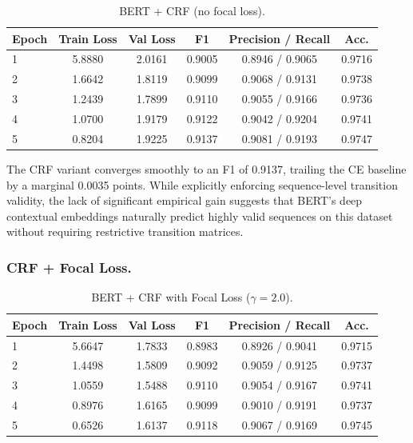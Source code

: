 \begin{table}[htbp]
    \centering
    \begin{tabular}{l c c c c c}
        \hline
        \textbf{Epoch} & \textbf{Train Loss} & \textbf{Val Loss} & \textbf{F1} & \textbf{Precision / Recall} & \textbf{Acc.} \\
        \hline
        1 & 5.8880 & 2.0161 & 0.9005 & 0.8946 / 0.9065 & 0.9716 \\
        2 & 1.6642 & 1.8119 & 0.9099 & 0.9068 / 0.9131 & 0.9738 \\
        3 & 1.2439 & 1.7899 & 0.9110 & 0.9055 / 0.9166 & 0.9736 \\
        4 & 1.0700 & 1.9179 & 0.9122 & 0.9042 / 0.9204 & 0.9741 \\
        5 & 0.8204 & 1.9225 & 0.9137 & 0.9081 / 0.9193 & 0.9747 \\
        \hline
    \end{tabular}
    \caption{BERT + CRF (no focal loss).}
    \label{tab:bert_crf}
\end{table}

\noindent The CRF variant converges smoothly to an F1 of 0.9137, trailing the CE baseline by a marginal 0.0035 points. While explicitly enforcing sequence-level transition validity, the lack of significant empirical gain suggests that BERT's deep contextual embeddings naturally predict highly valid sequences on this dataset without requiring restrictive transition matrices.

\subsubsection{CRF + Focal Loss.}

\begin{table}[htbp]
    \centering
    \begin{tabular}{l c c c c c}
        \hline
        \textbf{Epoch} & \textbf{Train Loss} & \textbf{Val Loss} & \textbf{F1} & \textbf{Precision / Recall} & \textbf{Acc.} \\
        \hline
        1 & 5.6647 & 1.7833 & 0.8983 & 0.8926 / 0.9041 & 0.9715 \\
        2 & 1.4498 & 1.5809 & 0.9092 & 0.9059 / 0.9125 & 0.9737 \\
        3 & 1.0559 & 1.5488 & 0.9110 & 0.9054 / 0.9167 & 0.9741 \\
        4 & 0.8976 & 1.6165 & 0.9099 & 0.9010 / 0.9191 & 0.9737 \\
        5 & 0.6526 & 1.6137 & 0.9118 & 0.9067 / 0.9169 & 0.9745 \\
        \hline
    \end{tabular}
    \caption{BERT + CRF with Focal Loss ($\gamma = 2.0$).}
    \label{tab:bert_crf_focal}
\end{table}

